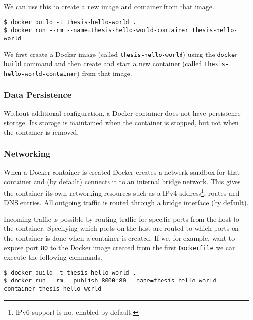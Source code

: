 We can use this to create a new image and container from that image.
\begin{lstlisting}[caption={Creating a Docker container from a \lstinline{Dockerfile}},label={docker:container},captionpos=b]
$ docker build -t thesis-hello-world .
$ docker run --rm --name=thesis-hello-world-container thesis-hello-world
\end{lstlisting}

We first create a Docker image (called \lstinline{thesis-hello-world}) using the \lstinline{docker build} command and then create and start a new container (called \lstinline{thesis-hello-world-container}) from that image.

\subsubsection{Data Persistence}
Without additional configuration, a Docker container does not have persistence storage. Its storage is maintained when the container is stopped, but not when the container is removed.

\subsubsection{Networking}

When a Docker container is created Docker creates a network sandbox for that container and (by default) connects it to an internal bridge network. This gives the container its own networking resources such as a IPv4 address\footnote{IPv6 support is not enabled by default.}, routes and DNS entries. All outgoing traffic is routed through a bridge interface (by default).

\hfill

Incoming traffic is possible by routing traffic for specific ports from the host to the container.
Specifying which ports on the host are routed to which ports on the container is done when a container is created. If we, for example, want to expose port \lstinline{80} to the Docker image created from the \hyperref[dockerfile:simple]{first \lstinline{Dockerfile}} we can execute the following commands.

\begin{lstlisting}[caption={Creating a Docker container with exposed port},label={docker:publish},captionpos=b]
$ docker build -t thesis-hello-world .
$ docker run --rm --publish 8000:80 --name=thesis-hello-world-container thesis-hello-world
\end{lstlisting}

